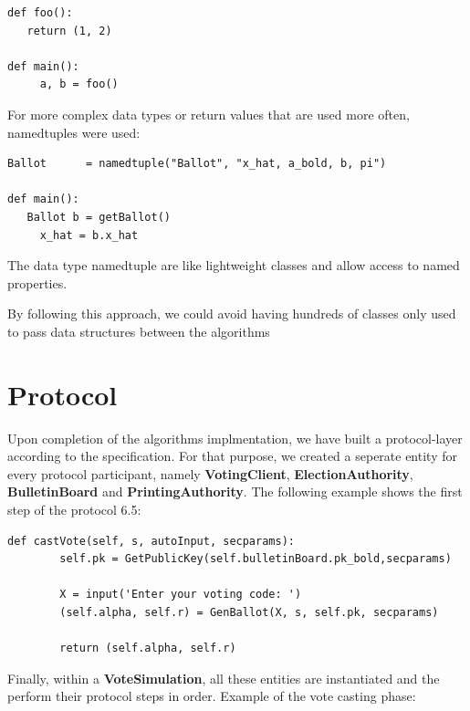 \documentclass[a4paper,12pt]{report}
\begin{document}
\begin{verbatim}
def foo():
   return (1, 2)

def main():
	 a, b = foo()
\end{verbatim}

For more complex data types or return values that are used more often, namedtuples were used:

\begin{verbatim}
Ballot      = namedtuple("Ballot", "x_hat, a_bold, b, pi")

def main():
   Ballot b = getBallot()
	 x_hat = b.x_hat
\end{verbatim}

The data type namedtuple are like lightweight classes and allow access to named properties.

By following this approach, we could avoid having hundreds of classes only used to pass data structures between the algorithms

\section{Protocol}
Upon completion of the algorithms implmentation, we have built a protocol-layer according to the specification. For that purpose, we created a seperate entity for every protocol participant, namely \textbf{VotingClient}, \textbf{ElectionAuthority}, \textbf{BulletinBoard} and \textbf{PrintingAuthority}. The following example shows the first step of the protocol 6.5:

\begin{verbatim}
def castVote(self, s, autoInput, secparams):
		self.pk = GetPublicKey(self.bulletinBoard.pk_bold,secparams)

		X = input('Enter your voting code: ')
		(self.alpha, self.r) = GenBallot(X, s, self.pk, secparams)

		return (self.alpha, self.r)
\end{verbatim}

Finally, within a \textbf{VoteSimulation}, all these entities are instantiated and the perform their protocol steps in order. Example of the vote casting phase:
\end{document}
